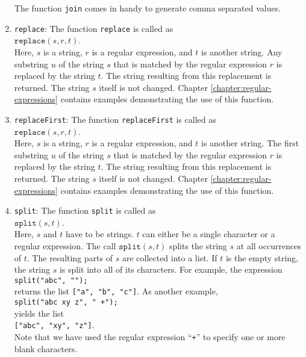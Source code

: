 \begin{enumerate}
      The function \texttt{join} comes in handy to generate comma separated values.
\item \texttt{replace}: The function \texttt{replace} is called as
      \\[0.2cm]
      \hspace*{1.3cm}
      $\mathtt{replace}(s, r, t)$.
      \\[0.2cm]
      Here, $s$ is a string, $r$ is a regular expression, and $t$ is another string.
      Any substring $u$ of the string $s$ that is matched by the regular expression $r$ is
      replaced by the string $t$.  The string resulting from this replacement is returned.
      The string $s$ itself is not changed.
      Chapter \ref{chapter:regular-expressions} contains examples demonstrating the use of this function.

\item \texttt{replaceFirst}: The function \texttt{replaceFirst} is called as
      \\[0.2cm]
      \hspace*{1.3cm}
      $\mathtt{replace}(s, r, t)$.
      \\[0.2cm]
      Here, $s$ is a string, $r$ is a regular expression, and $t$ is another string.
      The first substring $u$ of the string $s$ that is matched by the regular expression $r$ is
      replaced by the string $t$.  The string resulting from this replacement is returned.
      The string $s$ itself is not changed.
      Chapter \ref{chapter:regular-expressions} contains examples demonstrating the use of this function.

\item \texttt{split}: The function \texttt{split} is called as
      \\[0.2cm]
      \hspace*{1.3cm}
      $\texttt{split}(s,t)$.
      \\[0.2cm]
      Here, $s$ and $t$ have to be strings.  $t$ can either be a single character or 
      a regular expression. The call $\mathtt{split}(s, t)$ splits the string $s$ at all
      occurrences of $t$.  The resulting parts of $s$ are collected into a list.
      If $t$ is the empty string, the string $s$ is split into all of its characters.
      For example, the expression
      \\[0.2cm]
      \hspace*{1.3cm}
      \texttt{split("abc", "");}
      \\[0.2cm]
      returns the list \texttt{["a", "b", "c"]}.  As another example,
      \\[0.2cm]
      \hspace*{1.3cm}
      \texttt{split("abc  xy z", " +");}
      \\[0.2cm]
      yields the list
      \\[0.2cm]
      \hspace*{1.3cm}
      \texttt{["abc", "xy", "z"]}.
      \\[0.2cm]
      Note that we have used the regular expression ``\texttt{+}'' to specify one or more
      blank characters.


\end{enumerate}
